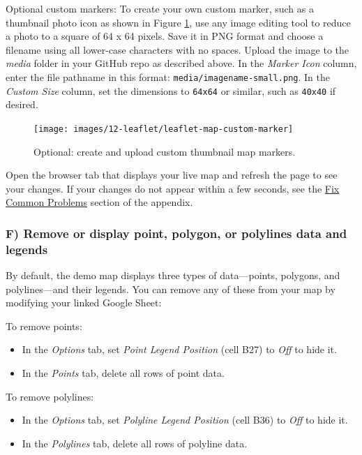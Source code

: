 \documentclass[
  english,
]{book}
\providecommand{\tightlist}{%
  \setlength{\itemsep}{0pt}\setlength{\parskip}{0pt}}
\begin{document}
Optional custom markers: To create your own custom marker, such as a thumbnail photo icon as shown in Figure \ref{fig:leaflet-map-custom-marker}, use any image editing tool to reduce a photo to a square of 64 x 64 pixels. Save it in PNG format and choose a filename using all lower-case characters with no spaces. Upload the image to the \emph{media} folder in your GitHub repo as described above. In the \emph{Marker Icon} column, enter the file pathname in this format: \texttt{media/imagename-small.png}. In the \emph{Custom Size} column, set the dimensions to \texttt{64x64} or similar, such as \texttt{40x40} if desired.



\begin{figure}
\texttt{[image: images/12-leaflet/leaflet-map-custom-marker]} \caption{Optional: create and upload custom thumbnail map markers.}\label{fig:leaflet-map-custom-marker}
\end{figure}

Open the browser tab that displays your live map and refresh the page to see your changes. If your changes do not appear within a few seconds, see the \href{fix.html}{Fix Common Problems} section of the appendix.

\hypertarget{f-remove-or-display-point-polygon-or-polylines-data-and-legends}{%
\subsubsection*{F) Remove or display point, polygon, or polylines data and legends}\label{f-remove-or-display-point-polygon-or-polylines-data-and-legends}}

By default, the demo map displays three types of data---points, polygons, and polylines---and their legends. You can remove any of these from your map by modifying your linked Google Sheet:

To remove points:

\begin{itemize}
\tightlist
\item
  In the \emph{Options} tab, set \emph{Point Legend Position} (cell B27) to \emph{Off} to hide it.
\item
  In the \emph{Points} tab, delete all rows of point data.
\end{itemize}

To remove polylines:

\begin{itemize}
\tightlist
\item
  In the \emph{Options} tab, set \emph{Polyline Legend Position} (cell B36) to \emph{Off} to hide it.
\item
  In the \emph{Polylines} tab, delete all rows of polyline data.
\end{itemize}
\end{document}
